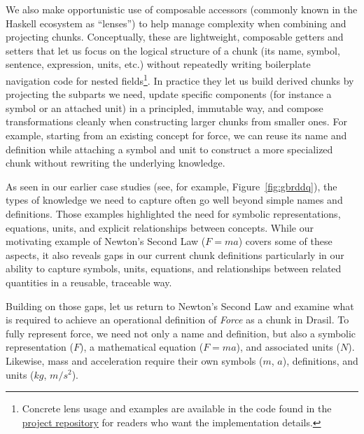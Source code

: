 We also make opportunistic use of composable accessors (commonly known in the 
Haskell ecosystem as ``lenses'') to help manage complexity when combining and
projecting chunks. Conceptually, these are lightweight, composable getters and 
setters that let us focus on the logical structure of a chunk (its name, 
symbol, sentence, expression, units, etc.) without repeatedly writing 
boilerplate navigation code for nested fields\footnote{Concrete lens usage and 
examples are available in the code found in the 
\href{https://www.github.com/jacquescarette/drasil}{project repository} for 
readers who want the implementation details.}. In practice they let us build 
derived chunks by projecting the subparts we need, update specific components 
(for instance a symbol or an attached unit) in a principled, immutable way, and 
compose transformations cleanly when constructing larger chunks from smaller 
ones. For example, starting from an existing concept for force, we can reuse 
its name and definition while attaching a symbol and unit to construct a more 
specialized chunk without rewriting the underlying knowledge.


As seen in our earlier case studies (see, for example, 
Figure~\ref{fig:gbrddq}), the types of knowledge we need to capture often go 
well beyond simple names and definitions. Those examples highlighted the need 
for symbolic representations, equations, units, and explicit relationships 
between concepts. While our motivating example of Newton's Second Law ($F=ma$) 
covers some of these aspects, it also reveals gaps in our current chunk 
definitions particularly in our ability to capture symbols, units, equations, 
and relationships between related quantities in a reusable, traceable way.

Building on those gaps, let us return to Newton's Second Law and examine what
is required to achieve an operational definition of \emph{Force} as a chunk 
in Drasil. To fully represent force, we need not only a name and definition, 
but also a symbolic representation ($F$), a mathematical equation ($F=ma$), and 
associated units ($N$). Likewise, mass and acceleration require their own 
symbols ($m$, $a$), definitions, and units ($kg$, $m/s^2$).


